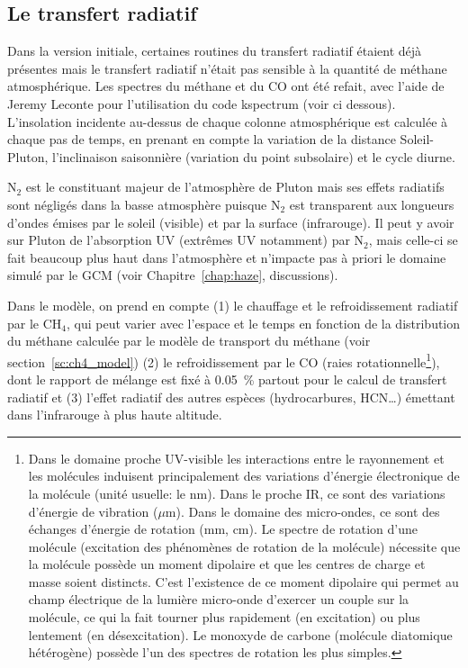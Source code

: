 
\subsection{Le transfert radiatif}
\label{sc:radia}

Dans la version initiale, certaines routines du transfert radiatif étaient déjà présentes mais le transfert radiatif n’était pas sensible à la quantité de méthane atmosphérique. Les spectres du méthane et du CO ont été refait, avec l’aide de Jeremy Leconte pour l'utilisation du code kspectrum (voir ci dessous). 
L’insolation incidente au-dessus de chaque colonne atmosphérique est calculée à chaque pas de temps, en prenant en compte la variation de la distance Soleil-Pluton, l’inclinaison saisonnière (variation du point subsolaire) et le cycle diurne. 

N$_2$ est le constituant majeur de l’atmosphère de Pluton mais ses effets radiatifs sont négligés dans la basse atmosphère puisque N$_2$ est transparent aux longueurs d’ondes émises par le soleil (visible) et par la surface (infrarouge). Il peut y avoir sur Pluton de l’absorption UV (extrêmes UV notamment) par N$_2$, mais celle-ci se fait beaucoup plus haut dans l’atmosphère et n’impacte pas à priori le domaine simulé par le GCM (voir Chapitre~\ref{chap:haze}, discussions). 

Dans le modèle, on prend en compte (1) le chauffage et le refroidissement radiatif par le CH$_4$, qui peut varier avec l’espace et le temps en fonction de la distribution du méthane calculée par le modèle de transport du méthane (voir section~\ref{sc:ch4_model}) (2) le refroidissement par le CO (raies rotationnelle\footnote{Dans le domaine proche UV-visible les interactions entre le rayonnement et les molécules induisent principalement des variations  d’énergie  électronique  de  la  molécule (unité usuelle: le nm). Dans le proche IR, ce sont des variations d’énergie de vibration ($\mu$m). Dans le  domaine des  micro-ondes, ce sont des échanges d’énergie de rotation (mm, cm). Le spectre de rotation d'une molécule (excitation des phénomènes de rotation de la molécule) nécessite que la molécule possède un moment dipolaire et que les centres de charge et masse soient distincts. C'est l'existence de ce moment dipolaire qui permet au champ électrique de la lumière micro-onde d'exercer un couple sur la molécule, ce qui la fait tourner plus rapidement (en excitation) ou plus lentement (en désexcitation). Le monoxyde de carbone (molécule diatomique hétérogène) possède l'un des spectres de rotation les plus simples.}), dont le rapport de mélange est fixé à 0.05~\% partout pour le calcul de transfert radiatif \citep{Lell:11a,Lell:16} et (3) l’effet radiatif des autres espèces (hydrocarbures, HCN…) émettant dans l’infrarouge à plus haute altitude.

